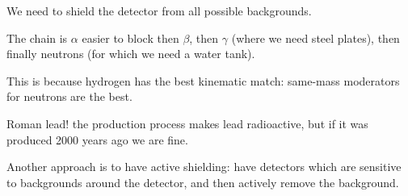 \documentclass[main.tex]{subfiles}
\begin{document}
We need to shield the detector from all possible backgrounds. 

The chain is \(\alpha \) easier to block then \(\beta \), then \(\gamma \) (where we need steel plates), then finally neutrons (for which we need a water tank). 

This is because hydrogen has the best kinematic match: same-mass moderators for neutrons are the best. 

Roman lead! the production process makes lead radioactive, 
but if it was produced 2000 years ago we are fine. 

Another approach is to have active shielding: have detectors which are sensitive to backgrounds around the detector, and then actively remove the background. 
\end{document}
